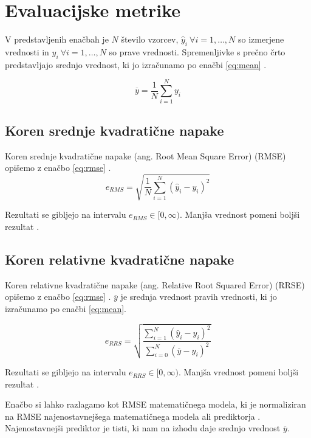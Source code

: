 \section{Evaluacijske metrike}
V predstavljenih enačbah je $N$ število vzorcev, $\hat{y}_i~ \forall i=1,\ldots,N$ so izmerjene vrednosti in $y_i ~\forall i=1,\ldots,N$ so prave vrednosti. Spremenljivke s prečno črto predstavljajo srednjo vrednost, ki jo izračunamo po enačbi \eqref{eq:mean} \cite{witten2005data}.

\begin{equation}
\overline{y} = \frac{1}{N} \sum_{i=1}^N y_i
\label{eq:mean}
\end{equation}


\subsection{Koren srednje kvadratične napake}
Koren srednje kvadratične napake (ang. Root Mean Square Error) (RMSE) opišemo z enačbo \eqref{eq:rmse} \cite{witten2005data}.
\begin{equation}
e_{RMS} = \sqrt{\frac{1}{N} \sum_{i=1}^{N}\left( \hat{y}_i - y_i \right)^2}
\label{eq:rmse}
\end{equation}

Rezultati se gibljejo na intervalu $e_{RMS} \in [0, \infty)$. Manjša vrednost pomeni boljši rezultat \cite{witten2005data}.

\subsection{Koren relativne kvadratične napake}
Koren relativne kvadratične napake (ang. Relative Root Squared Error) (RRSE) opišemo z enačbo \eqref{eq:rmse} \cite{witten2005data}. $\overline{y}$ je srednja vrednost pravih vrednosti, ki jo izračunamo po enačbi \eqref{eq:mean}.

\begin{equation}
e_{RRS} = \sqrt{\frac{\sum_{i=1}^{N} \left ( \hat{y}_i - y_i \right )^2}{\sum_{i=0}^{N} \left( \overline{y} - y_i \right)^2}}
\label{eq:rrse}
\end{equation}

Rezultati se gibljejo na intervalu $e_{RRS} \in [0, \infty)$. Manjša vrednost pomeni boljši rezultat \cite{witten2005data}.

Enačbo si lahko razlagamo kot RMSE matematičnega modela, ki je normaliziran na RMSE najenostavnejšega matematičnega modela ali prediktorja \cite{witten2005data}. Najenostavnejši prediktor je tisti, ki nam na izhodu daje srednjo vrednost $\overline{y}$. 

